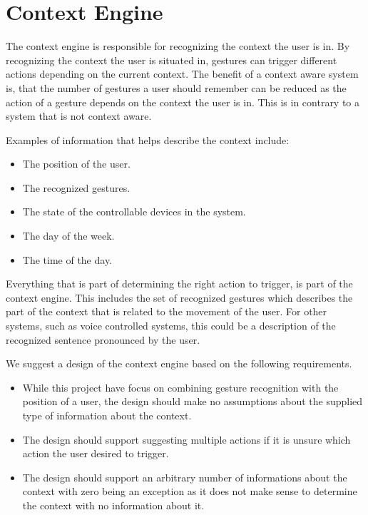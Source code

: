 \section{Context Engine}
\label{sec:analysis:context-engine}

The context engine is responsible for recognizing the context the user is in. By recognizing the context the user is situated in, gestures can trigger different actions depending on the current context. The benefit of a context aware system is, that the number of gestures a user should remember can be reduced as the action of a gesture depends on the context the user is in. This is in contrary to a system that is not context aware.

Examples of information that helps describe the context include:

\begin{itemize}
\item The position of the user.
\item The recognized gestures. 
\item The state of the controllable devices in the system.
\item The day of the week.
\item The time of the day.
\end{itemize}

Everything that is part of determining the right action to trigger, is part of the context engine. This includes the set of recognized gestures which describes the part of the context that is related to the movement of the user. For other systems, such as voice controlled systems, this could be a description of the recognized sentence pronounced by the user.


We suggest a design of the context engine based on the following requirements.

\begin{itemize}
\item While this project have focus on combining gesture recognition with the position of a user, the design should make no assumptions about the supplied type of information about the context.
\item The design should support suggesting multiple actions if it is unsure which action the user desired to trigger.
\item The design should support an arbitrary number of informations about the context with zero being an exception as it does not make sense to determine the context with no information about it.
\end{itemize}

